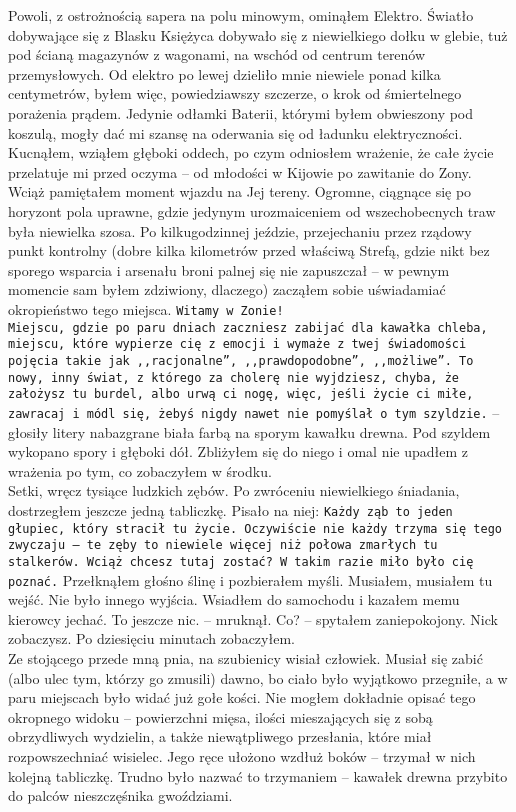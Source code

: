 \documentclass[../MAIN.tex]{subfiles}
\begin{document}
Powoli, z ostrożnością sapera na polu minowym, ominąłem Elektro. Światło dobywające się z Blasku Księżyca dobywało się z niewielkiego dołku w glebie, tuż pod ścianą magazynów z wagonami, na wschód od centrum terenów przemysłowych. Od elektro po lewej dzieliło mnie niewiele ponad kilka centymetrów, byłem więc, powiedziawszy szczerze, o krok od śmiertelnego porażenia prądem. Jedynie odłamki Baterii, którymi byłem obwieszony pod koszulą, mogły dać mi szansę na oderwania się od ładunku elektryczności. Kucnąłem, wziąłem głęboki oddech, po czym odniosłem wrażenie, że całe życie przelatuje mi przed oczyma -- od młodości w Kijowie po zawitanie do Zony. Wciąż pamiętałem moment wjazdu na Jej tereny. Ogromne, ciągnące się po horyzont pola uprawne, gdzie jedynym urozmaiceniem od wszechobecnych traw była niewielka szosa. Po kilkugodzinnej jeździe, przejechaniu przez rządowy punkt kontrolny (dobre kilka kilometrów przed właściwą Strefą, gdzie nikt bez sporego wsparcia i arsenału broni palnej się nie zapuszczał -- w pewnym
momencie sam byłem zdziwiony, dlaczego) zacząłem sobie uświadamiać okropieństwo tego miejsca.
\swk[27em]
\texttt{Witamy w Zonie!\\ Miejscu, gdzie po paru dniach zaczniesz zabijać dla kawałka chleba, miejscu, które wypierze cię z emocji i wymaże z twej świadomości pojęcia takie jak ,,racjonalne'', ,,prawdopodobne'', ,,możliwe''. To nowy, inny świat, z którego za cholerę nie wyjdziesz, chyba, że założysz tu burdel, albo urwą ci nogę, więc, jeśli życie ci miłe, zawracaj i módl się, żebyś nigdy nawet nie pomyślał o tym szyldzie.}
\qwk
-- głosiły litery nabazgrane biała farbą na sporym kawałku drewna. Pod szyldem wykopano spory i głęboki dół. Zbliżyłem się do niego i omal nie upadłem z wrażenia po tym, co zobaczyłem w środku.\\
Setki, wręcz tysiące ludzkich zębów. Po zwróceniu niewielkiego śniadania, dostrzegłem jeszcze jedną tabliczkę. Pisało na niej:
\swk[27em]
\texttt{Każdy ząb to jeden głupiec, który stracił tu życie. Oczywiście nie każdy trzyma się tego zwyczaju -- te zęby to niewiele więcej niż połowa zmarłych tu stalkerów. Wciąż chcesz tutaj zostać? W takim razie miło było cię poznać.}
\qwk
Przełknąłem głośno ślinę i pozbierałem myśli. Musiałem, musiałem tu wejść. Nie było innego wyjścia. Wsiadłem do samochodu i kazałem memu kierowcy jechać.
\sx To jeszcze nic. -- mruknął.
\xx Co? -- spytałem zaniepokojony.
\xx Nic\3k zobaczysz.
\qd
Po dziesięciu minutach zobaczyłem.
\\
Ze stojącego przede mną pnia, na szubienicy wisiał człowiek. Musiał się zabić (albo ulec tym, którzy go zmusili) dawno, bo ciało było wyjątkowo przegniłe, a w paru miejscach było widać już gołe kości. Nie mogłem dokładnie opisać tego okropnego widoku -- powierzchni mięsa, ilości mieszających się z sobą obrzydliwych wydzielin, a także niewątpliwego przesłania, które miał rozpowszechniać wisielec. Jego ręce ułożono wzdłuż boków -- trzymał w nich kolejną tabliczkę. Trudno było nazwać to trzymaniem -- kawałek drewna przybito do palców nieszczęśnika gwoździami.
\end{document}
